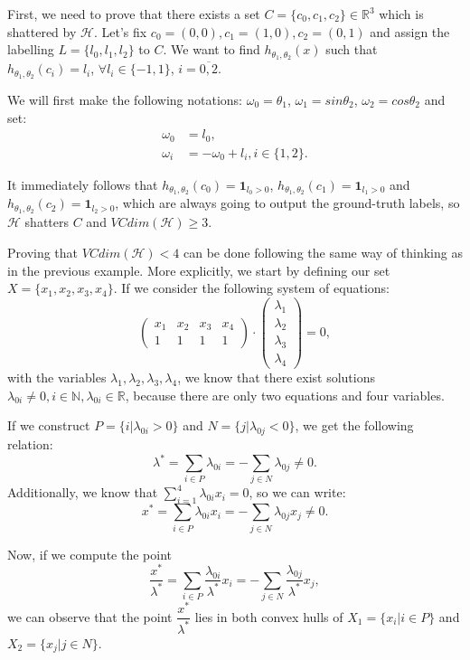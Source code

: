 \documentclass{article}
\begin{document}
First, we need to prove that there exists a set $C=\{c_0,c_1,c_2\}\in\mathbb{R}^3$ which is shattered by $\mathcal{H}$. Let's fix $c_0=(0,0),c_1=(1,0),c_2=(0,1)$ and assign the labelling $L=\{l_0,l_1,l_2\}$ to $C$. We want to find $h_{\theta_1,\theta_2}(x)$ such that $h_{\theta_1,\theta_2}(c_i)=l_i$, $\forall l_i\in\{-1,1\}$, $i=\overline{0,2}$.

We will first make the following notations: $\omega_0 = \theta_1$, $\omega_1 = sin\theta_2$, $\omega_2 = cos\theta_2$ and set:
\begin{align*}
\omega_0 &= l_0, \\
\omega_i &= -\omega_0 + l_i, i\in\{1,2\}.
\end{align*}

It immediately follows that $h_{\theta_1,\theta_2}(c_0)=\mathbf{1}_{l_0>0}$, $h_{\theta_1,\theta_2}(c_1)=\mathbf{1}_{l_1>0}$ and $h_{\theta_1,\theta_2}(c_2)=\mathbf{1}_{l_2>0}$, which are always going to output the ground-truth labels, so $\mathcal{H}$ shatters $C$ and $VCdim(\mathcal{H})\geq 3$.

Proving that $VCdim(\mathcal{H}) < 4$ can be done following the same way of thinking as in the previous example. More explicitly, we start by defining our set $X=\{x_1,x_2,x_3,x_4\}$. If we consider the following system of equations:
$$
\begin{pmatrix}
x_1 & x_2 & x_3 & x_4\\
1 & 1 & 1 & 1
\end{pmatrix}
\cdot
\begin{pmatrix}
\lambda_1 \\
\lambda_2 \\
\lambda_3 \\
\lambda_4
\end{pmatrix} = 0,
$$
with the variables $\lambda_1,\lambda_2,\lambda_3,\lambda_4$, we know that there exist solutions $\lambda_{0i}\neq 0, i\in\mathbb{N}, \lambda_{0i}\in\mathbb{R}$, because there are only two equations and four variables. 

If we construct $P=\{i|\lambda_{0i}>0\}$ and $N=\{j|\lambda_{0j}<0\}$, we get the following relation:
$$
\lambda^*=\sum_{i\in P}{\lambda_{0i}}=-\sum_{j\in N}{\lambda_{0j}}\neq 0.
$$
Additionally, we know that $\displaystyle\sum_{i=1}^{4}{\lambda_{0i}x_i}=0$, so we can write:
$$
x^*=\sum_{i\in P}{\lambda_{0i}x_i}=-\sum_{j\in N}{\lambda_{0j}x_j}\neq 0.
$$

Now, if we compute the point
$$
\dfrac{x^*}{\lambda^*}=\sum_{i\in P}{\dfrac{\lambda_{0i}}{\lambda^*}x_i}=-\sum_{j\in N}{\dfrac{\lambda_{0j}}{\lambda^*}x_j},
$$
we can observe that the point $\dfrac{x^*}{\lambda^*}$ lies in both convex hulls of $X_1=\{x_i|i\in P\}$ and $X_2=\{x_j|j\in N\}$. 
\end{document}

